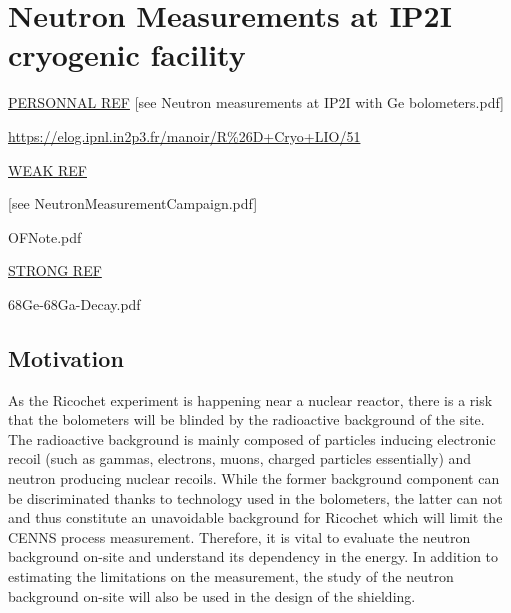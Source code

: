 
\chapter{Neutron Measurements at IP2I cryogenic facility} %

\label{ChapterNeutron} %


\underline{PERSONNAL REF}
{\color{red}[see Neutron measurements at IP2I with Ge
bolometers.pdf]}

\href{https://elog.ipnl.in2p3.fr/manoir/R%26D+Cryo+LIO/51}{https://elog.ipnl.in2p3.fr/manoir/R\%26D+Cryo+LIO/51}

\underline{WEAK REF}

{\color{red}[see NeutronMeasurementCampaign.pdf]}

OFNote.pdf

\underline{STRONG REF}

68Ge-68Ga-Decay.pdf




\section{Motivation}

As the Ricochet experiment is happening near a nuclear reactor, there is a risk that the bolometers will be blinded by the radioactive background of the site.
The radioactive background is mainly composed of particles inducing electronic recoil (such as gammas, electrons, muons, charged particles essentially) and neutron producing nuclear recoils.
While the former background component can be discriminated thanks to technology used in the bolometers, the latter can not and thus constitute an unavoidable background for Ricochet which will limit the CENNS process measurement.
Therefore, it is vital to evaluate the neutron background on-site and understand its dependency in the energy.
In addition to estimating the limitations on the measurement, the study of the neutron background on-site will also be used in the design of the shielding.

